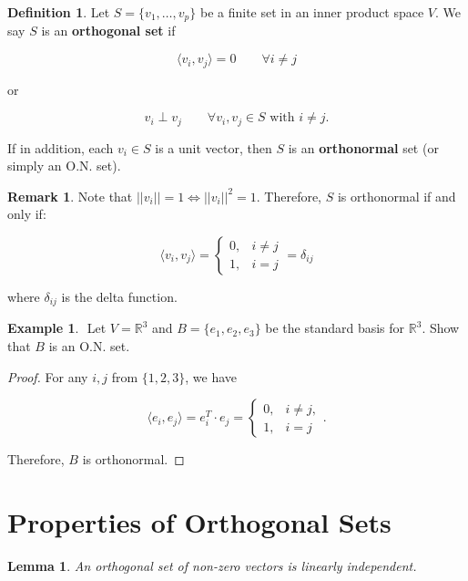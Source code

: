 \documentclass[12pt]{article}
\newtheorem*{lemma}{Lemma}
\theoremstyle{definition}
\newtheorem*{definition}{Definition}
\newtheorem*{example}{Example}
\newtheorem*{remark}{Remark}
\begin{document}
\begin{definition}
Let $S = \{v_1, \ldots, v_p \}$ be a finite set in an inner product space $V$. We say $S$ is
an \textbf{orthogonal set} if

\[
\langle v_i, v_j \rangle = 0 \quad \quad \forall i \neq j
\]

or 

\[
v_i \perp v_j \quad \quad \forall v_i, v_j \in S \text{ with } i \neq j.
\]

\noindent If in addition, each $v_i \in S$ is a unit vector, then $S$ is an \textbf{orthonormal} set (or
simply an O.N. set).

\end{definition}

\begin{remark}
Note that $||v_i|| = 1 \iff ||v_i||^2 = 1$. Therefore, $S$ is orthonormal if and only if:

\[
\langle v_i, v_j \rangle =
\begin{cases}
0, & i \neq j \\
1, & i = j
\end{cases}
= \delta_{ij}
\]

where $\delta_{ij}$ is the delta function.
\end{remark}

\begin{example} $ $
Let $V = \mathbb{R}^3$ and $B = \{e_1, e_2, e_3 \}$ be the standard basis for $\mathbb{R}^3$. Show that
$B$ is an O.N. set.

\begin{proof}
For any $i, j$ from $\{1, 2, 3 \}$, we have

\[
\langle e_i, e_j \rangle = e_i^T \cdot e_j = 
\begin{cases}
0, & i \neq j, \\
1, & i = j
\end{cases}.
\]

Therefore, $B$ is orthonormal.
\end{proof}
\end{example}


\section{Properties of Orthogonal Sets}

\begin{lemma}
An orthogonal set of non-zero vectors is linearly independent.
\end{lemma}
\end{document}
